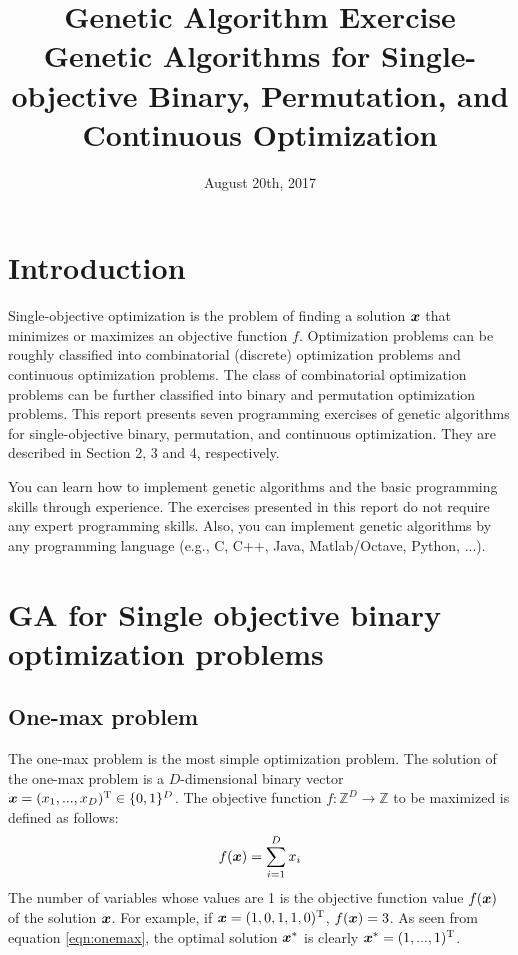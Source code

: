 \documentclass[11pt]{article}
\def\vector#1{\mbox{\boldmath $#1$}}
\def\vector#1{\mbox{\boldmath $#1$}}
\begin{document}
\title{Genetic Algorithm Exercise\\ {\normalsize Genetic Algorithms for Single-objective Binary, Permutation, and Continuous Optimization}}
\date{August 20th, 2017}
\maketitle




\section{Introduction}

Single-objective optimization is the problem of finding a solution $\vector{x}$ that minimizes or maximizes an objective function $f$.
Optimization problems can be roughly classified into combinatorial (discrete) optimization problems and continuous optimization problems.
The class of combinatorial optimization problems can be further classified into binary and permutation optimization problems.
This report presents seven programming exercises of genetic algorithms for single-objective binary, permutation, and continuous optimization.
They are described in Section 2, 3 and 4, respectively.

You can learn how to implement genetic algorithms and the basic programming skills through experience.
The exercises presented in this report do not require any expert programming skills.
Also, you can implement genetic algorithms by any programming language (e.g., C, C++, Java, Matlab/Octave, Python, ...).


\section{GA for Single objective binary optimization problems}

\subsection{One-max problem}


The one-max problem is the most simple optimization problem.
The solution of the one-max problem is a $D$-dimensional binary vector $\vector{x} = (x_1, ..., x_D)^{\rm T} \in \{0, 1\}^D$.
The objective function $f: \mathbb{Z}^D \rightarrow \mathbb{Z}$ to be maximized is defined as follows:
%
\begin{align}
\label{eqn:onemax}
f(\vector{x}) = \sum^D_{i=1} x_i
\end{align}
%
The number of variables whose values are 1 is the objective function value $f(\vector{x})$ of the solution $\vector{x}$.
For example, if $\vector{x} = (1, 0, 1, 1, 0)^{\rm T}$, $f(\vector{x}) = 3$.
As seen from equation \eqref{eqn:onemax}, the optimal solution $\vector{x}^*$ is clearly $\vector{x}^* = (1, ..., 1)^{\rm T}$.
\end{document}
